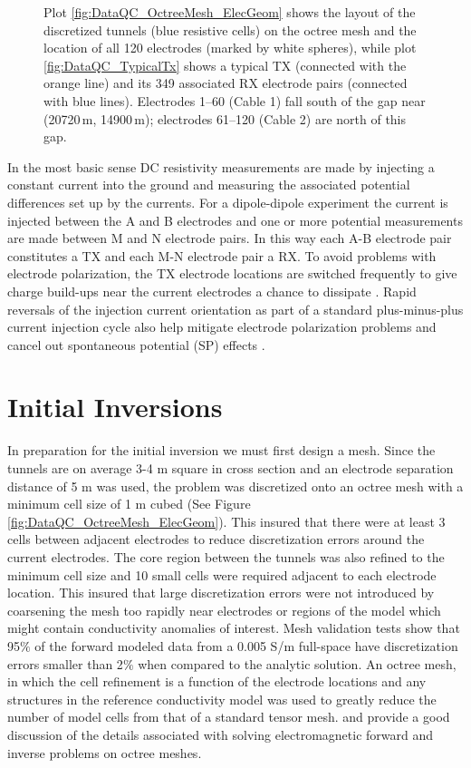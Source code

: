 \documentclass[final,authoryear,5p,times,twocolumn]{elsarticle}
\begin{document}
\begin{figure}[!ht]
   \caption{Plot \ref{fig:DataQC_OctreeMesh_ElecGeom} shows the layout of the discretized tunnels (blue resistive cells) on the octree mesh and the location of all 120 electrodes (marked by white spheres), while plot \ref{fig:DataQC_TypicalTx} shows a typical TX (connected with the orange line) and its 349 associated RX electrode pairs (connected with blue lines). Electrodes 1--60 (Cable 1) fall south of the gap near (20720\,m, 14900\,m); electrodes 61--120 (Cable 2) are north of this gap.}
   \label{fig:DataQC_Layout}
\end{figure}

In the most basic sense DC resistivity measurements are made by injecting a constant current into the ground and measuring the associated potential differences set up by the currents. For a dipole-dipole experiment the current is injected between the A and B electrodes and one or more potential measurements are made between M and N electrode pairs. In this way each A-B electrode pair constitutes a TX and each M-N electrode pair a RX. To avoid problems with electrode polarization, the TX electrode locations are switched frequently to give charge build-ups near the current electrodes a chance to dissipate \citep{Dahlin2000}. Rapid reversals of the injection current orientation as part of a standard plus-minus-plus current injection cycle also help mitigate electrode polarization problems and cancel out spontaneous potential (SP) effects \citep{Telford1990, Dahlin2000}.

\section{Initial Inversions}
\label{Initial_Inv}
In preparation for the initial inversion we must first design a mesh. Since the tunnels are on average 3-4 m square in cross section and an electrode separation distance of 5 m was used, the problem was discretized onto an octree mesh with a minimum cell size of 1 m cubed (See Figure \ref{fig:DataQC_OctreeMesh_ElecGeom}). This insured that there were at least 3 cells between adjacent electrodes to reduce discretization errors around the current electrodes. The core region between the tunnels was also refined to the minimum cell size and 10 small cells were required adjacent to each electrode location. This insured that large discretization errors were not introduced by coarsening the mesh too rapidly near electrodes or regions of the model which might contain conductivity anomalies of interest. Mesh validation tests show that 95$\%$ of the forward modeled data from a 0.005 S/m full-space have discretization errors smaller than 2$\%$ when compared to the analytic solution. An octree mesh, in which the cell refinement is a function of the electrode locations and any structures in the reference conductivity model was used to greatly reduce the number of model cells from that of a standard tensor mesh. \cite{Haber2007} and \cite{Haber2012} provide a good discussion of the details associated with solving electromagnetic forward and inverse problems on octree meshes.
\end{document}
